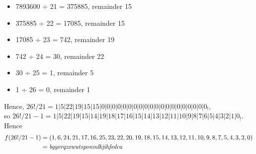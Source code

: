 \documentclass[11pt]{article}
\begin{document}
\begin{itemize}
	\item 7893600 ÷ 21 = 375885, remainder 15
	\item 375885 ÷ 22 = 17085, remainder 15
	\item 17085 ÷ 23 = 742, remainder 19
	\item 742 ÷ 24 = 30, remainder 22
	\item 30 ÷ 25 = 1, remainder 5
	\item 1 ÷ 26 = 0, remainder 1
\end{itemize}
Hence, $26!/21=1|5|22|19|15|15|0|0|0|0|0|0|0|0|0|0|0|0|0|0|0|0|0|0|0|0_!$,\\
so $26!/21-1=1|5|22|19|15|14|19|18|17|16|15|14|13|12|11|10|9|8|7|6|5|4|3|2|1|0_!$.
Hence
\begin{align*}
	f(26!/21-1)&=(1,6,24,21,17,16,25,23,22,20,19,18,15,14,13,12,11,10,9,8,7,5,4,3,2,0) \\
	&=\text{\textit{bgyvrqzxwutsponmlkjihfedca}}
\end{align*} 
\end{document}
